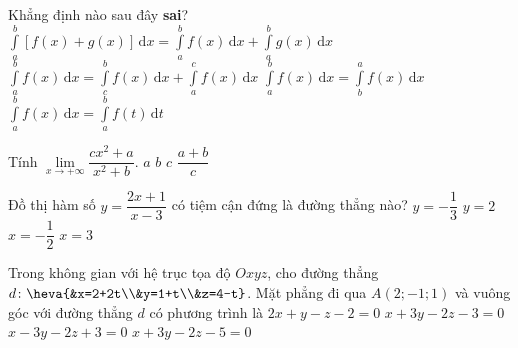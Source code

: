 \begin{ex}%
	Khẳng định nào sau đây \textbf{sai}?
	\choice 
	{$\displaystyle\int\limits_{a}^{b}\left[f(x)+g(x)\right ]\mathrm{\,d} x=\displaystyle\int\limits_{a}^{b}f(x)\mathrm{\,d} x+\displaystyle\int\limits_{a}^{b}g(x)\mathrm{\,d} x$}
	{$\displaystyle\int\limits_{a}^{b}f(x)\mathrm{\,d} x=\displaystyle\int\limits_{c}^{b}f(x)\mathrm{\,d} x+\displaystyle\int\limits_{a}^{c}f(x)\mathrm{\,d} x$}
	{\True $ \displaystyle\int\limits_{a}^{b} f(x)\mathrm{\,d}x =\displaystyle\int\limits_{b}^{a}f(x)\mathrm{\,d}x$}	
	{$ \displaystyle \int\limits_{a}^{b} f(x) \mathrm{\,d}x =\displaystyle \int\limits_{a}^{b} f(t) \mathrm{\,d}t$}
\end{ex}


\begin{ex}%
	Tính $ \displaystyle\lim\limits_{x\to +\infty}\dfrac{cx^2+a}{x^2+b}. $
	\choice
	{$ a $}
	{$ b	 $}
	{\True $ c $}
	{$ \dfrac{a+b}{c} $}
\end{ex}


\begin{ex}%
	Đồ thị hàm số $ y=\dfrac{2x+1	}{x-3} $ có tiệm cận đứng là đường thẳng nào?
	\choice
	{$ y=-\dfrac{1}{3} $}
	{$ y=2 $}
	{$ x=-\dfrac{1}{2	} $}
	{\True $ x=3 $}	
\end{ex}



\begin{ex}%
	Trong không gian với hệ trục tọa độ $ Oxyz$, cho đường thẳng $ d \colon \heva{&x=2+2t\\&y=1+t\\&z=4-t}$. Mặt phẳng đi qua $ A(2;-1;1) $ và vuông góc với đường thẳng $ d $ có phương trình là
	\choice
	{\True $ 2x +y-z-2=0$}
	{$ x+3y-2z-3=0 $}
	{$ x-3y-2z+3=0 $}
	{$ x+3y-2z-5=0 $}
\end{ex}


